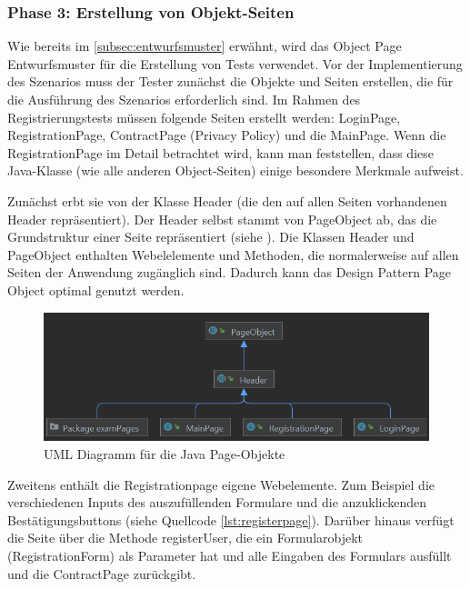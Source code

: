 \subsubsection{Phase 3: Erstellung von Objekt-Seiten}

Wie bereits im \autoref{subsec:entwurfsmuster} erwähnt, wird das Object
Page Entwurfsmuster für die Erstellung von Tests verwendet.
Vor der Implementierung des Szenarios muss der Tester zunächst
die Objekte und Seiten erstellen, die für die Ausführung des Szenarios
erforderlich sind. Im Rahmen des Registrierungstests müssen folgende
Seiten erstellt werden: LoginPage, RegistrationPage, ContractPage
(Privacy Policy) und die MainPage. Wenn die RegistrationPage
im Detail betrachtet wird, kann man feststellen, dass diese
Java-Klasse (wie alle anderen Object-Seiten) einige besondere Merkmale
aufweist.

Zunächst erbt sie von der Klasse Header (die den auf allen Seiten
vorhandenen Header repräsentiert). Der Header selbst stammt von
PageObject ab, das die Grundstruktur einer Seite repräsentiert
(siehe ). Die Klassen Header und PageObject enthalten
Webelelemente und Methoden, die normalerweise auf allen Seiten der
Anwendung zugänglich sind. Dadurch kann das Design Pattern Page
Object optimal genutzt werden.

\begin{figure}[H]
    \centering
    \includegraphics[scale=0.7]{images/pag-uml}
    \caption{UML Diagramm für die Java Page-Objekte} \label{fig:pag-uml}
\end{figure}

Zweitens enthält die Registrationpage eigene Webelemente.
Zum Beispiel die verschiedenen Inputs des auszufüllenden Formulare und
die anzuklickenden Bestätigungsbuttons (siehe Quellcode \ref{lst:registerpage}). Darüber hinaus
verfügt die Seite über die Methode registerUser, die ein
Formularobjekt (RegistrationForm) als Parameter hat und alle Eingaben
des Formulars ausfüllt und die ContractPage zurückgibt.

